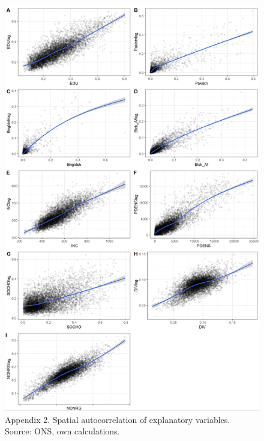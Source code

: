 \documentclass[12pt,twoside]{reedthesis}
\begin{document}
\begin{figure}
\includegraphics[width=0.95\linewidth]{figure/Appendix_2} \caption{Appendix 2. Spatial autocorrelation of explanatory variables. Source: ONS, own calculations.}\label{fig:appendix2}
\end{figure}
\end{document}
